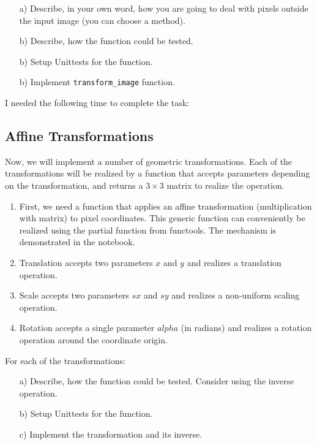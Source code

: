 \begin{enumerate}

\item[a)] Describe, in your own word, how you are going to deal with pixels outside the input image (you can choose a method).
\item[b)] Describe, how the function could be tested.
\item[b)] Setup Unittests for the function.
\item[b)] Implement \texttt{transform\_image} function.

\end{enumerate}

I needed the following time to complete the task:

\subsection{Affine Transformations}

Now, we will implement a number of geometric transformations. Each of the transformations will be realized by a function that accepts parameters depending on the transformation,
and returns a $3 \times 3$ matrix to realize the operation. 

\begin{enumerate}

\item First, we need a function that applies an affine transformation (multiplication with matrix) to pixel coordinates. This generic function can conveniently be realized using the partial function from functools. The mechanism is demonstrated in the notebook.  
\item Translation accepts two parameters $x$ and $y$ and realizes a translation operation. 
\item Scale accepts two parameters $sx$ and $sy$ and realizes a non-uniform scaling operation.
\item Rotation accepts a single parameter $alpha$ (in radians) and realizes a rotation operation around the coordinate origin. 

\end{enumerate}

For each of the transformations:

\begin{enumerate}
\item[a)] Describe, how the function could be tested. Consider using the inverse operation.
\item[b)] Setup Unittests for the function.
\item[c)] Implement the transformation and its inverse.
\end{enumerate}

